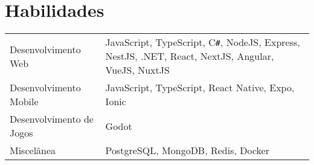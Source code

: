 \documentclass[a4paper,12pt]{article}
\begin{document}
\section{Habilidades}
\begin{tabularx}{\linewidth}{@{}l X@{}}
Desenvolvimento Web & \normalsize{JavaScript, TypeScript, C{\texttt{\#}}, NodeJS, Express, NestJS, .NET, React, NextJS, Angular, VueJS, NuxtJS}\\
Desenvolvimento Mobile & \normalsize{JavaScript, TypeScript, React Native, Expo, Ionic}\\
Desenvolvimento de Jogos & \normalsize{Godot}\\
Miscelânea  &  \normalsize{PostgreSQL, MongoDB, Redis, Docker}\\  
\end{tabularx}

\vfill
{}
\end{document}
